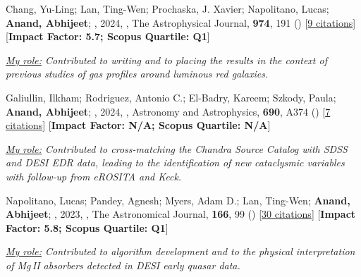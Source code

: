 \item[{\color{numcolor}\scriptsize4}] Chang, Yu-Ling; Lan, Ting-Wen; Prochaska, J. Xavier; Napolitano, Lucas; \textbf{Anand, Abhijeet}; \etal, 2024, , The Astrophysical Journal, \textbf{974}, 191 () [\href{https://ui.adsabs.harvard.edu/abs/2024ApJ...974..191C}{9 citations}] [\textbf{Impact Factor: 5.7; Scopus Quartile: Q1}]

\vspace{1mm}
\item\textit{\underline{My role:} Contributed to writing and to placing the results in the context of previous studies of gas profiles around luminous red galaxies.}
\vspace{1mm}

\item[{\color{numcolor}\scriptsize3}] Galiullin, Ilkham; Rodriguez, Antonio C.; El-Badry, Kareem; Szkody, Paula; \textbf{Anand, Abhijeet}; \etal, 2024, , Astronomy and Astrophysics, \textbf{690}, A374 () [\href{https://ui.adsabs.harvard.edu/abs/2024A&A...690A.374G}{7 citations}] [\textbf{Impact Factor: N/A; Scopus Quartile: N/A}]

\vspace{1mm}
\item\textit{\underline{My role:} Contributed to cross-matching the Chandra Source Catalog with SDSS and DESI EDR data, leading to the identification of new cataclysmic variables with follow-up from eROSITA and Keck.}
\vspace{1mm}

\item[{\color{numcolor}\scriptsize2}] Napolitano, Lucas; Pandey, Agnesh; Myers, Adam D.; Lan, Ting-Wen; \textbf{Anand, Abhijeet}; \etal, 2023, , The Astronomical Journal, \textbf{166}, 99 () [\href{https://ui.adsabs.harvard.edu/abs/2023AJ....166...99N}{30 citations}] [\textbf{Impact Factor: 5.8; Scopus Quartile: Q1}]

\vspace{1mm}
\item\textit{\underline{My role:} Contributed to algorithm development and to the physical interpretation of Mg\,II absorbers detected in DESI early quasar data.}
\vspace{1mm}

